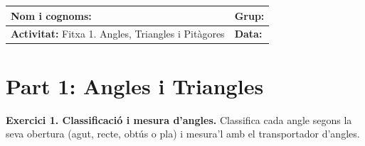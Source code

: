 \documentclass[12pt,a4paper]{article}
\begin{document}
\begingroup
\renewcommand{\arraystretch}{2.2}
\begin{tabularx}{\textwidth}{|X|p{4cm}|}
    \hline
    \textbf{Nom i cognoms:} & \textbf{Grup:} \\ \hline
    \textbf{Activitat:} Fitxa 1. Angles, Triangles i Pitàgores & \textbf{Data:} \\ \hline
\end{tabularx}
\endgroup

\vspace{0.5cm}

\section*{Part 1: Angles i Triangles}

\textbf{Exercici 1. Classificació i mesura d'angles.}
Classifica cada angle segons la seva obertura (agut, recte, obtús o pla) i mesura'l amb el transportador d'angles.
\end{document}
